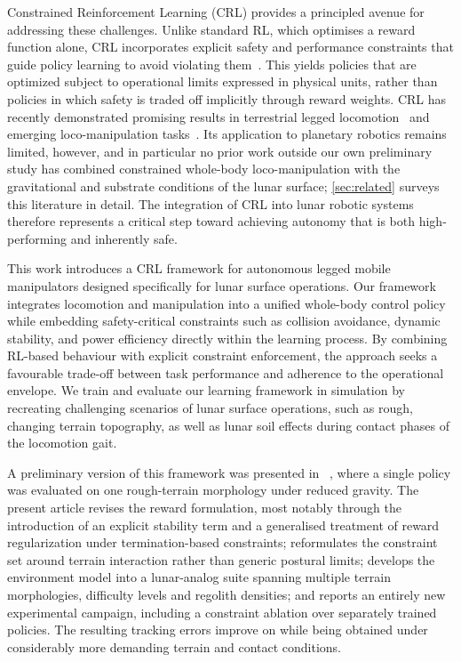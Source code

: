 Constrained Reinforcement Learning (CRL) provides a principled avenue for addressing these challenges. Unlike standard RL, which optimises a reward function alone, CRL incorporates explicit safety and performance constraints that guide policy learning to avoid violating them~\citep{achiam2017constrained}. This yields policies that are optimized subject to operational limits expressed in physical units, rather than policies in which safety is traded off implicitly through reward weights. CRL has recently demonstrated promising results in terrestrial legged locomotion~\citep{LeeCRL, KimNotOnlyRewards, chane2024cat, chanesane2024solo} and emerging loco-manipulation tasks~\citep{dadiotis2025dynamicobjectgoalpushing, MaBadminton}. Its application to planetary robotics remains limited, however, and in particular no prior work outside our own preliminary study \citep{belmonte2025isparo} has combined constrained whole-body loco-manipulation with the gravitational and substrate conditions of the lunar surface; \cref{sec:related} surveys this literature in detail. The integration of CRL into lunar robotic systems therefore represents a critical step toward achieving autonomy that is both high-performing and inherently safe.

This work introduces a CRL framework for autonomous legged mobile manipulators designed specifically for lunar surface operations. Our framework integrates locomotion and manipulation into a unified whole-body control policy while embedding safety-critical constraints such as collision avoidance, dynamic stability, and power efficiency directly within the learning process. By combining RL-based behaviour with explicit constraint enforcement, the approach seeks a favourable trade-off between task performance and adherence to the operational envelope. We train and evaluate our learning framework in simulation by recreating challenging scenarios of lunar surface operations, such as rough, changing terrain topography, as well as lunar soil effects during contact phases of the locomotion gait.

A preliminary version of this framework was presented in ~\citep{belmonte2025isparo}, where a single policy was evaluated on one rough-terrain morphology under reduced gravity. The present article revises the reward formulation, most notably through the introduction of an explicit stability term and a generalised treatment of reward regularization under termination-based constraints; reformulates the constraint set around terrain interaction rather than generic postural limits; develops the environment model into a lunar-analog suite spanning multiple terrain morphologies, difficulty levels and regolith densities; and reports an entirely new experimental campaign, including a constraint ablation over separately trained policies. The resulting tracking errors improve on \citep{belmonte2025isparo} while being obtained under considerably more demanding terrain and contact conditions.

